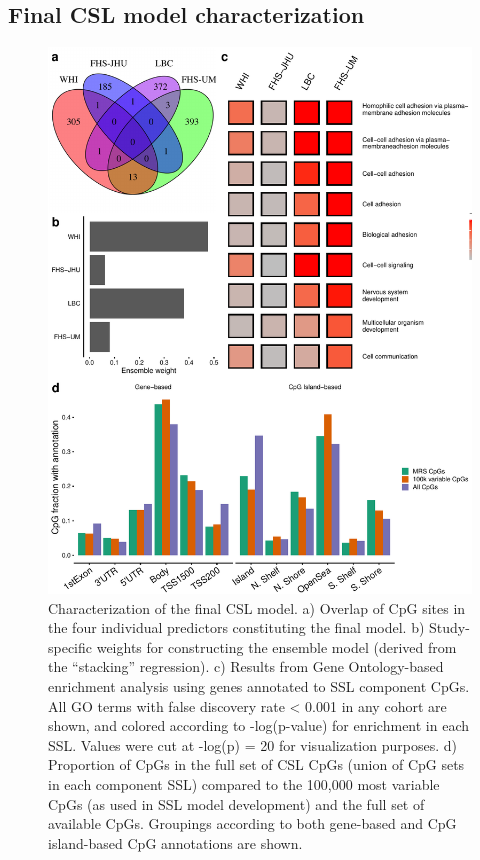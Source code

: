 \documentclass[]{article}
\begin{document}
\hypertarget{final-csl-model-characterization}{%
\subsection{Final CSL model
characterization}\label{final-csl-model-characterization}}

\begin{figure}
\centering
\includegraphics{figures/characterization-1.pdf}
\caption{Characterization of the final CSL model. a) Overlap of CpG
sites in the four individual predictors constituting the final model. b)
Study-specific weights for constructing the ensemble model (derived from
the ``stacking'' regression). c) Results from Gene Ontology-based
enrichment analysis using genes annotated to SSL component CpGs. All GO
terms with false discovery rate \textless{} 0.001 in any cohort are
shown, and colored according to -log(p-value) for enrichment in each
SSL. Values were cut at -log(p) = 20 for visualization purposes. d)
Proportion of CpGs in the full set of CSL CpGs (union of CpG sets in
each component SSL) compared to the 100,000 most variable CpGs (as used
in SSL model development) and the full set of available CpGs. Groupings
according to both gene-based and CpG island-based CpG annotations are
shown.}
\end{figure}
\end{document}
